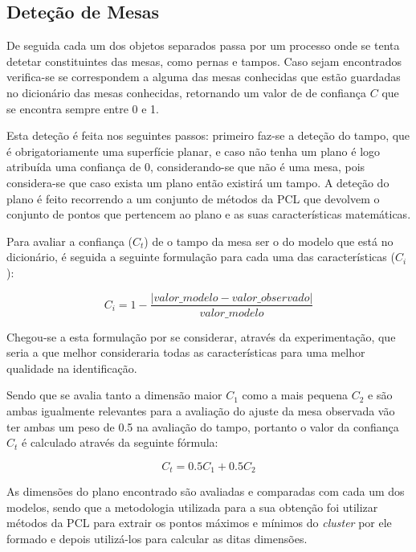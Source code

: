 \subsection{Deteção de Mesas}

De seguida cada um dos objetos separados passa por um processo onde se tenta detetar constituintes das mesas, como pernas e tampos. Caso sejam encontrados verifica-se se correspondem a alguma das mesas conhecidas que estão guardadas no dicionário das mesas conhecidas, retornando um valor de de confiança \(C\) que se encontra sempre entre 0 e 1.

Esta deteção é feita nos seguintes passos: primeiro faz-se a deteção do tampo, que é obrigatoriamente uma superfície planar, e caso não tenha um plano é logo atribuída uma confiança de 0, considerando-se que não é uma mesa, pois considera-se que caso exista um plano então existirá um tampo. A deteção do plano é feito recorrendo a um conjunto de métodos da PCL que devolvem o conjunto de pontos que pertencem ao plano e as suas características matemáticas.  

 Para avaliar a confiança (\(C_t\)) de o tampo da mesa ser o do modelo que está no dicionário, é seguida a seguinte formulação para cada uma das características (\(C_i\)):

\begin{equation}\label{eq:ci}
C_i = 1 - \frac{|valor\_modelo - valor\_observado|}{valor\_modelo}
\end{equation}

Chegou-se a esta formulação por se considerar, através da experimentação, que seria a que melhor consideraria todas as características para uma melhor qualidade na identificação.

Sendo que se avalia tanto a dimensão maior \(C_1\) como a mais pequena  \(C_2\) e são ambas igualmente relevantes para a avaliação do ajuste da mesa observada vão ter ambas um peso de 0.5 na avaliação do tampo, portanto o valor da confiança \(C_t\) é calculado através da seguinte fórmula:

\begin{equation}\label{eq:ct}
C_t = 0.5C_1 + 0.5C_2
\end{equation}

As dimensões do plano encontrado são avaliadas e comparadas com cada um dos modelos, sendo que a metodologia utilizada para a sua obtenção foi utilizar métodos da PCL para extrair os pontos máximos e mínimos do \emph{cluster} por ele formado e depois utilizá-los para calcular as ditas dimensões.

